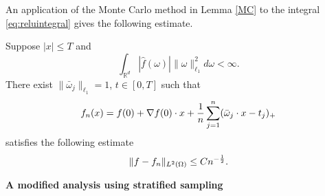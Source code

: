 An application of the Monte Carlo method in Lemma \ref{MC} to the integral \eqref{eq:reluintegral} gives the following estimate.
\begin{theorem} 
Suppose $|x|\le T$ and 
$$
 \int_{\mathbb{R}^{d}} |\hat{f}(\omega)|\|\omega\|_{\ell_1}^{2} d\omega<\infty.
$$
There exist  $\|\bar \omega_j\|_{\ell_1}=1$, $t\in [0,T]$ such that 
$$
f_n(x)= f(0) + \nabla  f(0) \cdot x  + {1\over n}\sum_{j=1}^{n} (\bar \omega_j\cdot x - t_j)_+
$$ 
satisfies the following estimate 
\begin{equation}
\|f - f_n \|_{L^2(\Omega)} \leq C n^{-{1\over 2}}.
\end{equation} 
\end{theorem}

\iffalse
\noindent\textbf{A modified analysis using stratified sampling}

